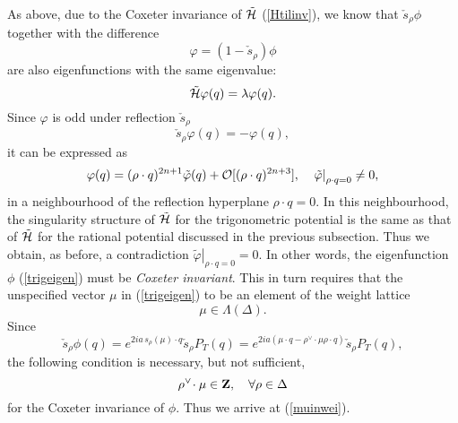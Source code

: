 \documentclass[a4paper,12pt]{article}
\begin{document}
As above, due to the Coxeter invariance of \(\tilde{\cal H}\)
(\ref{Htilinv}),  we know that \(\check{s}_{\rho}\phi\) together with
the difference
\[
   \varphi=(1-\check{s}_{\rho})\phi
\]
are also eigenfunctions with the same
eigenvalue:
\begin{equation}
   \tilde{\cal H}\varphi(q)=\lambda \varphi(q).
   \label{phitileq}
\end{equation}
Since \(\varphi\)  is
odd under reflection \(\check{s}_{\rho}\)
\[
   \check{s}_{\rho}\varphi(q)=-\varphi(q),
\]
it can be expressed as
\begin{equation}
   \varphi(q)=(\rho\cdot q)^{2n+1}\tilde{\varphi}(q)+{\cal O}[(\rho\cdot
   q)^{2n+3}],\quad
   \left.\tilde{\varphi}\right|_{\rho\cdot q=0}\neq0,
   \label{phitilfac}
\end{equation}
in a neighbourhood of the reflection hyperplane \(\rho\cdot q=0\).
In this neighbourhood, the singularity structure of
\(\tilde{\cal H}\) for the trigonometric potential is the same as
that of \(\tilde{\cal H}\) for the rational potential discussed in
the previous subsection. Thus we obtain, as before, a contradiction
\(\left.\tilde{\varphi}\right|_{\rho\cdot q=0}=0\).
In other words, the eigenfunction \(\phi\) (\ref{trigeigen}) must
be {\em Coxeter invariant\/}.
This in turn requires that the unspecified vector \(\mu\) in
(\ref{trigeigen}) to be an element of the weight lattice
\begin{equation}
   \mu\in\Lambda(\Delta).
   \label{muinwei}
\end{equation}
Since
\[
   \check{s}_{\rho}\phi(q)=e^{2ia\, s_{\rho}(\mu)\cdot
   q}\check{s}_{\rho}P_T(q)=
   e^{2ia (\mu\cdot q-\rho^\vee\!\cdot\mu \rho\cdot
   q)}\check{s}_{\rho}P_T(q),
\]
the following condition is necessary, but not sufficient,
\begin{equation}
   \rho^\vee\!\cdot\mu\in{\bf Z},\quad \forall \rho\in\Delta
\end{equation}
for the Coxeter invariance of \(\phi\). Thus we arrive at
(\ref{muinwei}).
\end{document}
